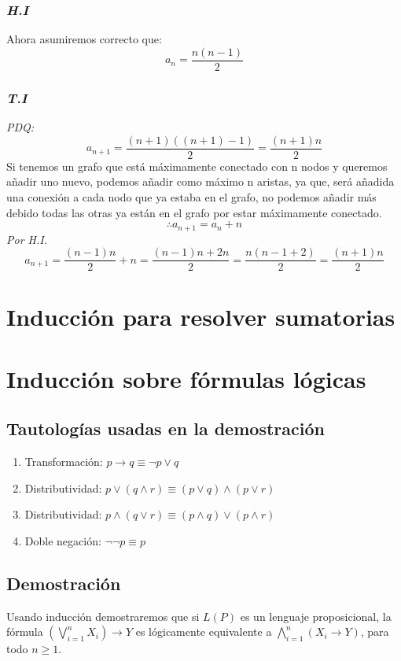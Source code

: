 \documentclass{article}
\begin{document}
\subsubsection*{\emph{H.I}}
Ahora asumiremos correcto que:
\[ a_n = \frac{n(n-1)}{2} \]

\subsubsection*{\emph{T.I}}
\emph{PDQ:}
\[ a_{n+1} = \frac{(n+1)((n+1) - 1)}{2} = \frac{(n+1)n}{2} \]
Si tenemos un grafo que está máximamente conectado con n nodos y queremos añadir
uno nuevo, podemos añadir como máximo n aristas, ya que, será añadida una conexión a 
cada nodo que ya estaba en el grafo, no podemos añadir más debido todas las otras 
ya están en el grafo por estar máximamente conectado.
\[ \therefore a_{n+1} = a_n + n \]
\emph{Por H.I.}
\[ a_{n+1} = \frac{(n-1)n}{2} + n = \frac{(n-1)n + 2n}{2} = \frac{n(n-1+2)}{2} = \frac{(n+1)n}{2} \]


\section{Inducción para resolver sumatorias}

\section{Inducción sobre fórmulas lógicas}
\subsection{Tautologías usadas en la demostración}
\begin{enumerate}
  \item Transformación:  $p \rightarrow q \equiv \neg p \lor q$
  \item Distributividad: $p \lor (q \land r) \equiv (p \lor q) \land (p \lor r)$
  \item Distributividad: $p \land (q \lor r) \equiv (p \land q) \lor (p \land r)$
  \item Doble negación: $\neg\neg p \equiv p$
\end{enumerate}

\subsection{Demostración}
Usando inducción demostraremos que si $L(P)$ es un lenguaje proposicional, la fórmula $(\bigvee _{i=1}^{n} X_i) \rightarrow Y $ es lógicamente equivalente a $\bigwedge _{i=1}^{n} (X_i \rightarrow Y)$,
para todo $n \ge 1$.
\end{document}
